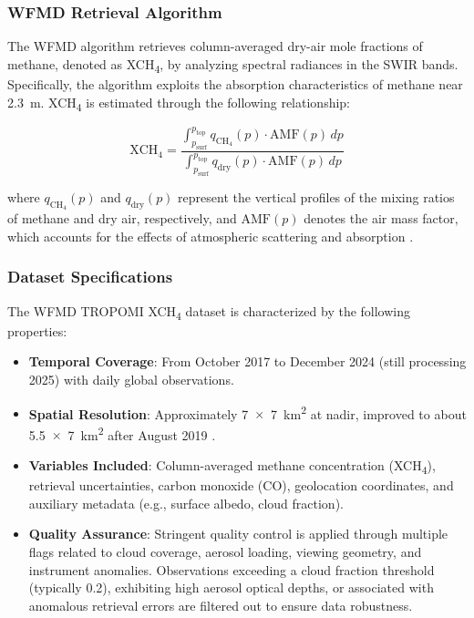 \subsubsection{WFMD Retrieval Algorithm}
The WFMD algorithm retrieves column-averaged dry-air mole fractions of methane, denoted as XCH\textsubscript{4}, by analyzing spectral radiances in the SWIR bands. Specifically, the algorithm exploits the absorption characteristics of methane near 2.3~\textmu m. XCH\textsubscript{4} is estimated through the following relationship:

\begin{equation}
\mathrm{XCH}_4 = \frac{\int_{p_\mathrm{surf}}^{p_\mathrm{top}} q_{\mathrm{CH}_4}(p) \cdot \mathrm{AMF}(p) \, dp}{\int_{p_\mathrm{surf}}^{p_\mathrm{top}} q_{\mathrm{dry}}(p) \cdot \mathrm{AMF}(p) \, dp}
\end{equation}

where $q_{\mathrm{CH}_4}(p)$ and $q_{\mathrm{dry}}(p)$ represent the vertical profiles of the mixing ratios of methane and dry air, respectively, and $\mathrm{AMF}(p)$ denotes the air mass factor, which accounts for the effects of atmospheric scattering and absorption \cite{Schneising2019, Schneising2023}.

\subsubsection{Dataset Specifications}
The WFMD TROPOMI XCH\textsubscript{4} dataset is characterized by the following properties:

\begin{itemize}
    \item \textbf{Temporal Coverage}: From October 2017 to December 2024 (still processing 2025) with daily global observations.
    \item \textbf{Spatial Resolution}: Approximately 7~$\times$~7~km\textsuperscript{2} at nadir, improved to about 5.5~$\times$~7~km\textsuperscript{2} after August 2019 \cite{Schneising2023}.
    \item \textbf{Variables Included}: Column-averaged methane concentration (XCH\textsubscript{4}), retrieval uncertainties, carbon monoxide (CO), geolocation coordinates, and auxiliary metadata (e.g., surface albedo, cloud fraction).
    \item \textbf{Quality Assurance}: Stringent quality control is applied through multiple flags related to cloud coverage, aerosol loading, viewing geometry, and instrument anomalies. Observations exceeding a cloud fraction threshold (typically 0.2), exhibiting high aerosol optical depths, or associated with anomalous retrieval errors are filtered out to ensure data robustness.
\end{itemize}

